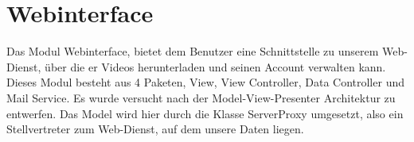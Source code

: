 \section{Webinterface}
Das Modul Webinterface, bietet dem Benutzer eine Schnittstelle zu unserem Web-Dienst, über die er Videos herunterladen und seinen Account verwalten kann. Dieses Modul besteht aus 4 Paketen, View, View Controller, Data Controller und Mail Service. Es wurde versucht nach der Model-View-Presenter Architektur zu entwerfen. Das Model wird hier durch die Klasse ServerProxy umgesetzt, also ein Stellvertreter zum Web-Dienst, auf dem unsere Daten liegen.
\newpage

\newpage
%
%
